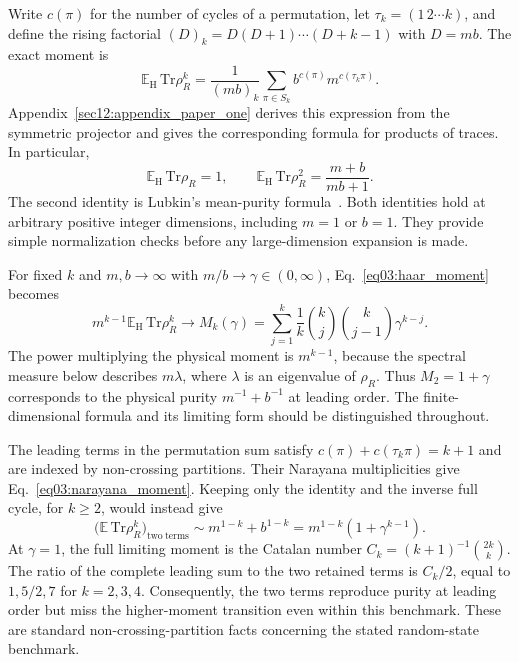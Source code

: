 \documentclass[11pt,letterpaper]{article}
\theoremstyle{plain}
\theoremstyle{definition}
\theoremstyle{remark}
\begin{document}
Write $c(\pi)$ for the number of cycles of a permutation, let
$\tau_k=(1\,2\cdots k)$, and define the rising factorial
$(D)_k=D(D+1)\cdots(D+k-1)$ with $D=mb$.  The exact moment is
\begin{equation}
\label{eq03:haar_moment}
 \mathbb E_{\mathrm H}\,\mathrm{Tr}\rho_R^k
 =\frac{1}{(mb)_k}
  \sum_{\pi\in S_k}b^{c(\pi)}m^{c(\tau_k\pi)}.
\end{equation}
Appendix~\ref{sec12:appendix_paper_one} derives this expression from the
symmetric projector and gives the corresponding formula for products of
traces.  In particular,
\begin{equation}
\label{eq03:exact_purity}
 \mathbb E_{\mathrm H}\,\mathrm{Tr}\rho_R=1,
 \qquad
 \mathbb E_{\mathrm H}\,\mathrm{Tr}\rho_R^2
 =\frac{m+b}{mb+1}.
\end{equation}
The second identity is Lubkin's mean-purity formula~\cite{lubkin1978}.
Both identities hold at arbitrary positive integer dimensions, including
$m=1$ or $b=1$.  They provide simple normalization checks before any
large-dimension expansion is made.

For fixed $k$ and $m,b\to\infty$ with $m/b\to\gamma\in(0,\infty)$,
Eq.~\eqref{eq03:haar_moment} becomes
\begin{equation}
\label{eq03:narayana_moment}
 m^{k-1}\mathbb E_{\mathrm H}\,\mathrm{Tr}\rho_R^k
 \longrightarrow M_k(\gamma)
 =\sum_{j=1}^k\frac1k\binom{k}{j}\binom{k}{j-1}\gamma^{k-j}.
\end{equation}
The power multiplying the physical moment is $m^{k-1}$, because the
spectral measure below describes $m\lambda$, where $\lambda$ is an
eigenvalue of $\rho_R$.  Thus $M_2=1+\gamma$ corresponds to the physical
purity $m^{-1}+b^{-1}$ at leading order.  The finite-dimensional formula
and its limiting form should be distinguished throughout.

The leading terms in the permutation sum satisfy
$c(\pi)+c(\tau_k\pi)=k+1$ and are indexed by non-crossing partitions.
Their Narayana multiplicities give Eq.~\eqref{eq03:narayana_moment}.
Keeping only the identity and the inverse full cycle, for $k\geq2$,
would instead give
\begin{equation}
\label{eq03:two_saddle}
 \bigl(\mathbb E\,\mathrm{Tr}\rho_R^k\bigr)_{\mathrm{two\ terms}}
 \sim m^{1-k}+b^{1-k}
 =m^{1-k}(1+\gamma^{k-1}).
\end{equation}
At $\gamma=1$, the full limiting moment is the Catalan number
$C_k=(k+1)^{-1}\binom{2k}{k}$.  The ratio of the complete leading sum
to the two retained terms is $C_k/2$, equal to $1,5/2,7$ for
$k=2,3,4$.  Consequently, the two terms reproduce purity at leading
order but miss the higher-moment transition even within this benchmark.
These are standard non-crossing-partition facts concerning the stated
random-state benchmark.
\end{document}
